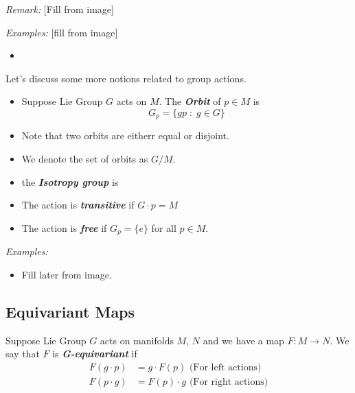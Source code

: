 \documentclass{article}
\begin{document}
\begin{dottedbox}
  \emph{Remark:} [Fill from image]
\end{dottedbox}

\vskip 0.5cm
\emph{Examples:} [fill from image]
\begin{itemize}
  \item 
\end{itemize}

Let's discuss some more notions related to group actions.

\begin{mathdefinitionbox}{}
  \begin{itemize}
    \item Suppose Lie Group $G$ acts on $M$. The \emph{\textbf{Orbit}} of $p \in M$ is 
    \[ G_p = \{gp \;:\; g \in G\} \] 
  
    \item Note that two orbits are eitherr equal or disjoint.
    \item We denote the set of orbits as $G/M$.
    \item the \emph{\textbf{Isotropy group}} is 
    \[  \]
    \item The action is \emph{\textbf{transitive}} if $G \cdot p = M$
    \item The action is \emph{\textbf{free}} if $G_p = \{e\}$ for all $p \in M$.
  \end{itemize}
\end{mathdefinitionbox}

\vskip 0.5cm
\emph{Examples:}
\begin{itemize}
  \item Fill later from image.
\end{itemize}


\vskip 1cm
\subsection{Equivariant Maps}

\begin{mathdefinitionbox}{}
  Suppose Lie Group $G$ acts on manifolds $M$, $N$ and we have a map $F : M \rightarrow N$. We say that $F$ is \emph{\textbf{G-equivariant}} if 
  \begin{align*}
    F \left( g \cdot p \right) &= g \cdot F(p) \text{  (For left actions)} \\
    F \left( p \cdot g \right) &= F(p) \cdot g \text{  (For right actions)}
  \end{align*}
\end{mathdefinitionbox}
\end{document}
